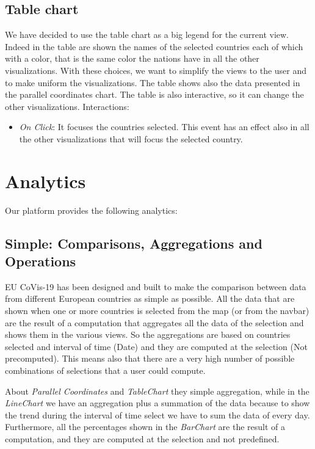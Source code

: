 \documentclass[10pt,conference]{IEEEtran}
\begin{document}
\subsection{Table chart}
We have decided to use the table chart as a big legend for the current view. Indeed in the table are shown the names of the selected countries each of which with a color, that is the same color the nations have in all the other visualizations. With these choices, we want to simplify the views to the user and to make uniform the visualizations.
The table shows also the data presented in the parallel coordinates chart. The table is also interactive, so it can change the other visualizations.
Interactions:
\begin{itemize}
 \item {\em On Click}: It focuses the countries selected. This event has an effect also in all the other visualizations that will focus the selected country.
\end{itemize}

\begin{figure}
\end{figure}

\section{Analytics}
Our platform provides the following analytics:
\subsection{Simple: Comparisons, Aggregations and Operations} 
EU CoVis-19 has been designed and built to make the comparison between data from different European countries as simple as possible. All the data that are shown when one or more countries is selected from the map (or from the navbar) are the result of a computation that aggregates all the data of the selection and shows them in the various views.
So the aggregations are based on countries selected and interval of time (Date) and they are computed at the selection (Not precomputed). This means also that there are a very high number of possible combinations of selections that a user could compute. 

About {\em Parallel Coordinates} and {\em TableChart} they simple aggregation, while in the {\em LineChart} we have an aggregation plus a summation of the data because to show the trend during the interval of time select we have to sum the data of every day. Furthermore, all the percentages shown in the {\em BarChart} are the result of a computation, and they are computed at the selection and not predefined.
\end{document}
